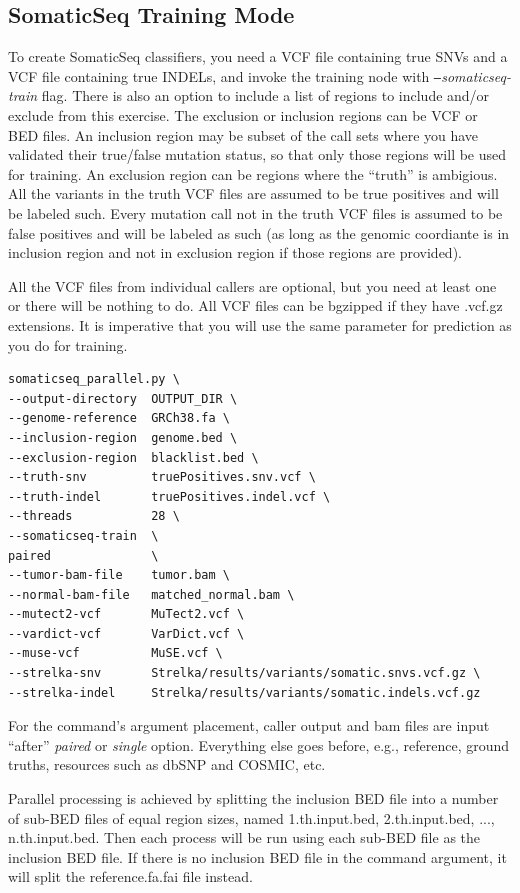 \documentclass[10pt,letterpaper]{article}
\begin{document}
\begin{sloppypar}
\subsection{SomaticSeq Training Mode} \label{somaticseq_train}

To create SomaticSeq classifiers, you need a VCF file containing true SNVs and a VCF file containing true INDELs, and invoke the training node with \emph{\texttt{--}somaticseq-train} flag. There is also an option to include a list of regions to include and/or exclude from this exercise. The exclusion or inclusion regions can be VCF or BED files. An inclusion region may be subset of the call sets where you have validated their true/false mutation status, so that only those regions will be used for training. An exclusion region can be regions where the ``truth'' is ambigious. All the variants in the truth VCF files are assumed to be true positives and will be labeled such. Every mutation call not in the truth VCF files is assumed to be false positives and will be labeled as such (as long as the genomic coordiante is in inclusion region and not in exclusion region if those regions are provided). 

All the VCF files from individual callers are optional, but you need at least one or there will be nothing to do. All VCF files can be bgzipped if they have .vcf.gz extensions. It is imperative that you will use the same parameter for prediction as you do for training. 


\begin{lstlisting}
somaticseq_parallel.py \
--output-directory  OUTPUT_DIR \
--genome-reference  GRCh38.fa \
--inclusion-region  genome.bed \
--exclusion-region  blacklist.bed \
--truth-snv         truePositives.snv.vcf \
--truth-indel       truePositives.indel.vcf \
--threads           28 \
--somaticseq-train  \
paired              \
--tumor-bam-file    tumor.bam \
--normal-bam-file   matched_normal.bam \
--mutect2-vcf       MuTect2.vcf \
--vardict-vcf       VarDict.vcf \
--muse-vcf          MuSE.vcf \
--strelka-snv       Strelka/results/variants/somatic.snvs.vcf.gz \
--strelka-indel     Strelka/results/variants/somatic.indels.vcf.gz
\end{lstlisting}


For the command's argument placement, caller output and bam files are input ``after'' \textit{paired} or \textit{single} option. Everything else goes before, e.g., reference, ground truths, resources such as dbSNP and COSMIC, etc. 

Parallel processing is achieved by splitting the inclusion BED file into a number of sub-BED files of equal region sizes, named 1.th.input.bed, 2.th.input.bed, ..., n.th.input.bed. Then each process will be run using each sub-BED file as the inclusion BED file. If there is no inclusion BED file in the command argument, it will split the reference.fa.fai file instead. 


\end{sloppypar}
\end{document}
